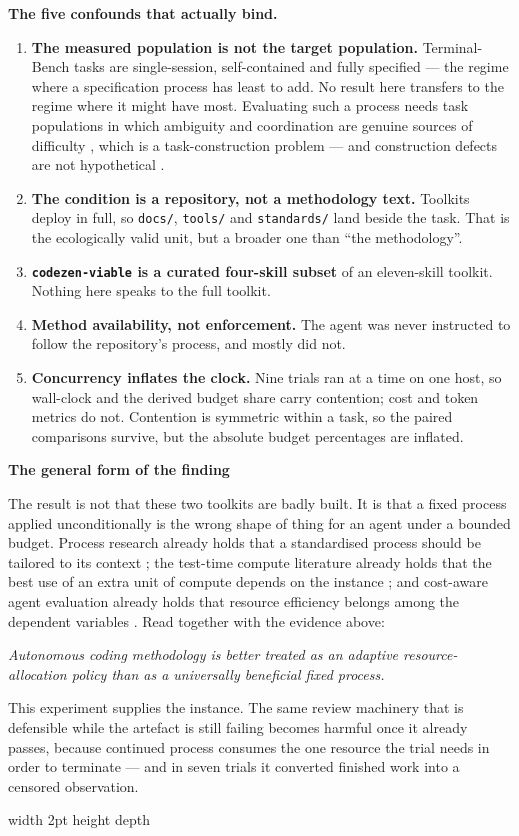 \documentclass[11pt,a4paper]{article}
\newenvironment{finding}[1]
  {\par\medskip\noindent\begin{lrbox}{\findingbox}%
   \begin{minipage}{\dimexpr\linewidth-2\fboxsep-4pt}%
   \vspace{3pt}\textbf{\color{accent}#1}\par\smallskip\small}
  {\vspace{4pt}\end{minipage}\end{lrbox}%
   \noindent\textcolor{accent}{\vrule width 2pt height \dimexpr\ht\findingbox\relax depth \dimexpr\dp\findingbox\relax}%
   \colorbox{shade}{\usebox{\findingbox}}\par\medskip}
\newcommand{\code}[1]{\texttt{\small #1}}
\begin{document}
\noindent\textbf{The five confounds that actually bind.}

\begin{enumerate}
\item \textbf{The measured population is not the target population.} Terminal-Bench tasks are
      single-session, self-contained and fully specified --- the regime where a specification
      process has least to add. No result here transfers to the regime where it might have
      most. Evaluating such a process needs task populations in which ambiguity and
      coordination are genuine sources of difficulty \citep{ribeiro2020ambiguity}, which is a
      task-construction problem --- and construction defects are not hypothetical
      \citep{openai2026signal}.
\item \textbf{The condition is a repository, not a methodology text.} Toolkits deploy in full,
      so \code{docs/}, \code{tools/} and \code{standards/} land beside the task. That is the
      ecologically valid unit, but a broader one than ``the methodology''.
\item \textbf{\code{codezen-viable} is a curated four-skill subset} of an eleven-skill toolkit.
      Nothing here speaks to the full toolkit.
\item \textbf{Method availability, not enforcement.} The agent was never instructed to follow
      the repository's process, and mostly did not.
\item \textbf{Concurrency inflates the clock.} Nine trials ran at a time on one host, so
      wall-clock and the derived budget share carry contention; cost and token metrics do not.
      Contention is symmetric within a task, so the paired comparisons survive, but the
      absolute budget percentages are inflated.
\end{enumerate}

\begin{finding}{The general form of the finding}
The result is not that these two toolkits are badly built. It is that a fixed process applied
unconditionally is the wrong shape of thing for an agent under a bounded budget. Process
research already holds that a standardised process should be tailored to its context
\citep{xu2007tailoring}; the test-time compute literature already holds that the best use of
an extra unit of compute depends on the instance \citep{snell2024scaling}; and cost-aware
agent evaluation already holds that resource efficiency belongs among the dependent variables
\citep{liu2026costbench}. Read together with the evidence above:

\smallskip
\emph{Autonomous coding methodology is better treated as an adaptive resource-allocation
policy than as a universally beneficial fixed process.}
\smallskip

This experiment supplies the instance. The same review machinery that is defensible while the
artefact is still failing becomes harmful once it already passes, because continued process
consumes the one resource the trial needs in order to terminate --- and in seven trials it
converted finished work into a censored observation.
\end{finding}
\end{document}
